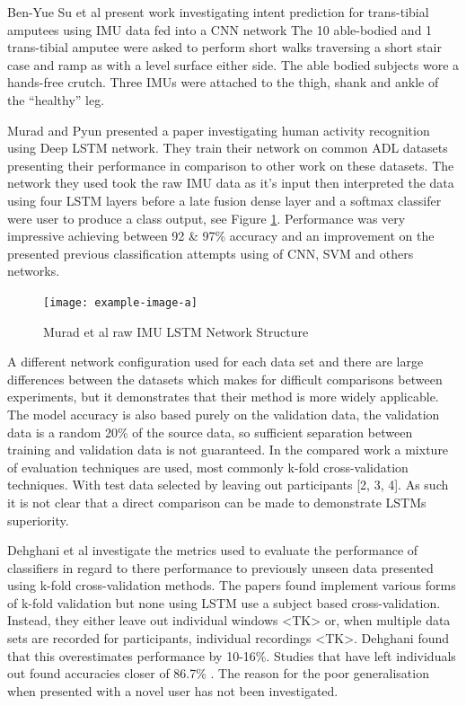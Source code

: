Ben-Yue Su et al present work investigating intent prediction for trans-tibial amputees using IMU data fed into a CNN network\cite{Su2019} The 10 able-bodied and 1 trans-tibial amputee were asked to perform short walks traversing a short stair case and ramp as with a level surface either side. The able bodied subjects wore a hands-free crutch. Three IMUs were attached to the thigh, shank and ankle of the “healthy” leg.

Murad and Pyun presented a paper investigating human activity recognition using Deep LSTM network\cite{Murad2017}. They train their network on common ADL datasets presenting their performance in comparison to other work on these datasets. The network they used took the raw IMU data as it's input then interpreted the data using four LSTM layers before a late fusion dense layer and a softmax classifer were user to produce a class output, see Figure \ref{fig:murad_lst_network_structure}. Performance was very impressive achieving between 92 \& 97\% accuracy and an improvement on the presented previous classification attempts using of CNN, SVM and others networks.

\begin{figure}[!htb]
    \centering
    \texttt{[image: example-image-a]}
    \caption{Murad et al raw IMU LSTM Network Structure}
    \label{fig:murad_lst_network_structure}
\end{figure}

A different network configuration used for each data set and there are large differences between the datasets which makes for difficult comparisons between experiments, but it demonstrates that their method is more widely applicable. The model accuracy is also based purely on the validation data, the validation data is a random 20\% of the source data, so sufficient separation between training and validation data is not guaranteed. In the compared work a mixture of evaluation techniques are used, most commonly k-fold cross-validation techniques. With test data selected by leaving out participants [2, 3, 4]. As such it is not clear that a direct comparison can be made to demonstrate LSTMs superiority.

Dehghani et al investigate the metrics used to evaluate the performance of classifiers in regard to there performance to previously unseen data presented using k-fold cross-validation methods\cite{Dehghani2019}. The papers found implement various forms of k-fold validation but none using LSTM use a subject based cross-validation. Instead, they either leave out individual windows \cite{Murad2017, Wang2020}<TK> or, when multiple data sets are recorded for participants, individual recordings \cite{Ordonez2016}<TK>. Dehghani found that this overestimates performance by 10-16\%. Studies that have left individuals out found accuracies closer of 86.7\% \cite{Zhao2018}. The reason for the poor generalisation when presented with a novel user has not been investigated.

